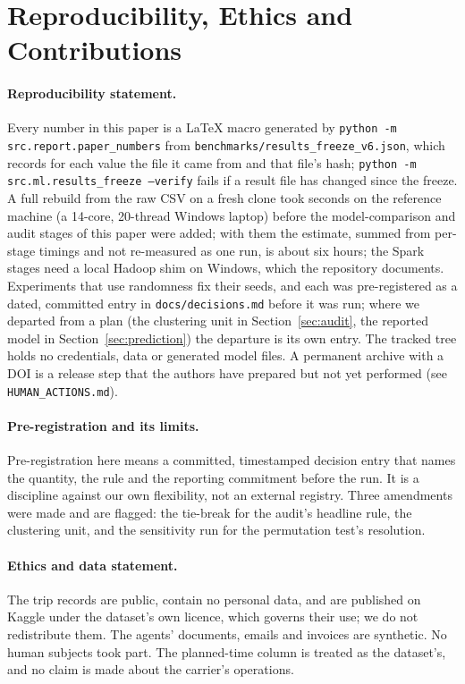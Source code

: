 \section{Reproducibility, Ethics and Contributions}\label{sec:repro}

\paragraph{Reproducibility statement.} Every number in this paper is a \LaTeX{} macro generated by \texttt{python -m src.report.paper\_numbers} from \texttt{benchmarks/results\_freeze\_v6.json}, which records for each value the file it came from and that file's hash; \texttt{python -m src.ml.results\_freeze --verify} fails if a result file has changed since the freeze. A full rebuild from the raw CSV on a fresh clone took \fzFreshCloneRebuildS{} seconds on the reference machine (a 14-core, 20-thread Windows laptop) before the model-comparison and audit stages of this paper were added; with them the estimate, summed from per-stage timings and not re-measured as one run, is about six hours; the Spark stages need a local Hadoop shim on Windows, which the repository documents. Experiments that use randomness fix their seeds, and each was pre-registered as a dated, committed entry in \texttt{docs/decisions.md} before it was run; where we departed from a plan (the clustering unit in Section~\ref{sec:audit}, the reported model in Section~\ref{sec:prediction}) the departure is its own entry. The tracked tree holds no credentials, data or generated model files. A permanent archive with a DOI is a release step that the authors have prepared but not yet performed (see \texttt{HUMAN\_ACTIONS.md}).

\paragraph{Pre-registration and its limits.} Pre-registration here means a committed, timestamped decision entry that names the quantity, the rule and the reporting commitment before the run. It is a discipline against our own flexibility, not an external registry. Three amendments were made and are flagged: the tie-break for the audit's headline rule, the clustering unit, and the sensitivity run for the permutation test's resolution.

\paragraph{Ethics and data statement.} The trip records are public, contain no personal data, and are published on Kaggle under the dataset's own licence, which governs their use; we do not redistribute them. The agents' documents, emails and invoices are synthetic. No human subjects took part. The planned-time column is treated as the dataset's, and no claim is made about the carrier's operations.

